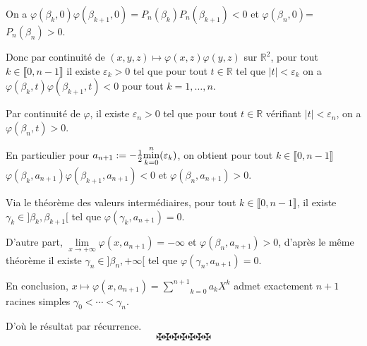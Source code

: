 On a $\varphi (\beta_k, 0) \varphi (\beta_{k + 1}, 0) = P_n (\beta_k) P_n
(\beta_{k + 1}) < 0$ et $\varphi (\beta_n, 0)$=$P_n (\beta_n) > 0$.

Donc par continuit{\'e} de $(x, y, z) \longmapsto \varphi (x, z) \varphi (y,
z)$ sur $\mathbb{R}^2$, pour tout $k \in \llbracket 0, n - 1 \rrbracket$ il
existe $\varepsilon_k > 0$ tel que pour tout $t \in \mathbb{R}$ tel que $| t |
< \varepsilon_k$ on a $\varphi (\beta_k, t) \varphi (\beta_{k + 1}, t) < 0$
pour tout $k = 1, \ldots, n$.

Par continuit{\'e} de $\varphi$, il existe $\varepsilon_n > 0$ tel que pour
tout $t \in \mathbb{R}$ v{\'e}rifiant $| t | < \varepsilon_n$, on a $\varphi
(\beta_n, t) > 0$.

En particulier pour $a_{n + 1} := - \frac{1}{2} \underset{k =
0}{\overset{n}{\min}} (\varepsilon_k)$, on obtient pour tout $k \in \llbracket
0, n - 1 \rrbracket$ $\varphi (\beta_k, a_{n + 1}) \varphi (\beta_{k + 1},
a_{n + 1}) < 0$ et $\varphi (\beta_n, a_{n + 1}) > 0$.

Via le th{\'e}or{\`e}me des valeurs interm{\'e}diaires, pour tout $k \in
\llbracket 0, n - 1 \rrbracket$, il existe $\gamma_k \in] \beta_k, \beta_{k +
1} [$ tel que $\varphi (\gamma_k, a_{n + 1}) = 0$.

D'autre part, $\underset{x \rightarrow + \infty}{\lim} \varphi (x, a_{n + 1})
= - \infty$ et $\varphi (\beta_n, a_{n + 1}) > 0$, d'apr{\`e}s le m{\^e}me
th{\'e}or{\`e}me il existe $\gamma_n \in] \beta_n, + \infty [$ tel que
$\varphi (\gamma_n, a_{n + 1}) = 0$.

En conclusion, $x \longmapsto \varphi (x, a_{n + 1}) = \underset{k =
0}{\overset{n + 1}{\sum}} a_k X^k$ admet exactement $n + 1$ racines simples
$\gamma_0 < \cdots < \gamma_n$.

D'o{\`u} le r{\'e}sultat par r{\'e}currence.
\[ \maltese \maltese \maltese \maltese \maltese \maltese \maltese \]
